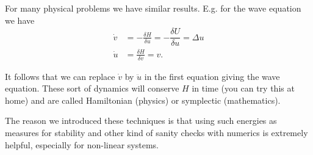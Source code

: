 \begin{frame}
	For many physical problems we have similar results. E.g. for the wave equation we have
	\[ \begin{split}
		\dot{v} &= -\frac{\delta H}{\delta u} = -\dfrac{\delta U}{\delta u} = \Delta u \\
		\dot{u} &= \frac{\delta H}{\delta v} = v.  
	\end{split} \]
	
	\pause
	It follows that we can replace $ \dot{v} $ by $ \ddot{u} $ in the first equation giving the wave equation. These sort of dynamics will conserve $ H $ in time (you can try this at home) and are called \alert{Hamiltonian} (physics) or \alert{symplectic} (mathematics). 
	
	\pause
	The reason we introduced these techniques is that using such energies as measures for stability and other kind of sanity checks with numerics is extremely helpful, especially for non-linear systems.
\end{frame}



